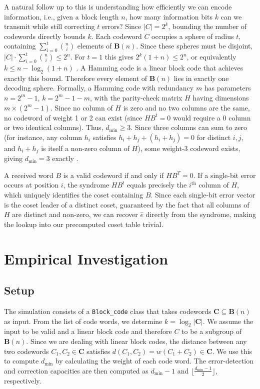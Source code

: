 \documentclass{article}
\begin{document}
A natural follow up to this is understanding how efficiently we can encode information, i.e., given a block length 
\(n\), how many information bits \(k\) can we transmit while still correcting \(t\) errors? Since \(|C| = 2^k\), 
bounding the number of codewords directly bounds \(k\). Each codeword \(C\) occupies a sphere of radius \(t\), 
containing \(\sum_{i=0}^{t}\binom{n}{i}\) elements of \(\mathbf{B}(n)\). Since these spheres must be disjoint,
\(|C| \cdot \sum_{i=0}^{t}\binom{n}{i} \leq 2^n\). For \(t=1\) this gives \(2^k(1+n) \leq 2^n\), or equivalently
\(k \leq n - \log_2(1+n)\) \parencite{berlekamp1972survey}.
A Hamming code is a linear block code that achieves exactly this bound. Therefore every element of 
\(\mathbf{B}(n)\) lies in exactly one decoding sphere. Formally, a Hamming code with redundancy \(m\)
has parameters \(n = 2^m - 1\), \(k = 2^m - 1 - m\), with the parity-check matrix \(H\) having dimensions
\(m \times (2^m-1)\). Since no column of \(H\) is zero and no two columns are the same, no codeword of weight 
1 or 2 can exist (since \(HB^t = 0\) would require a 0 column or two identical columns). Thus, \(d_\text{min}
\geq 3\). Since three columns can sum to zero (for instance, any column $h_i$ satisfies $h_i + h_j + (h_i + h_j)
= 0$ for distinct $i, j$, and $h_i + h_j$ is itself a non-zero column of $H$), some weight-3 codeword exists,
giving \(d_\text{min} = 3\) exactly \parencite{hamming1950error}.

A received word \(B\) is a valid codeword if and only if \(HB^T = 0\). If a single-bit error occurs at position 
\(i\), the syndrome \(HB^t\) equals precisely the \(i^\text{th}\) column of \(H\), which uniquely identifies 
the coset containing \(B\). Since each single-bit error vector is the coset leader of a distinct coset, 
guaranteed by the fact that all columns of \(H\) are distinct and non-zero, we can recover \(\hat{e}\) directly
from the syndrome, making the lookup into our precomputed coset table trivial.

\section{Empirical Investigation}
\subsection{Setup}
The simulation \parencite{jaish2026} consists of a \texttt{Block\_code} class that takes codewords
$\mathbf{C} \subseteq \mathbf{B}(n)$ as input. From the list of code words, we determine 
$k = \log_2 |\mathbf{C}|$. We assume the input to be valid and a linear block code 
and therefore $C$ to be a subgroup of $\mathbf{B}(n)$. Since we are dealing with linear block codes,
the distance between any two codewords $C_1, C_2 \in \mathbf{C}$ satisfies $d(C_1, C_2) = w(C_1 + C_2)
\in \mathbf{C}$. We use this to compute $d_\text{min}$ by calculating the weight of each code word. 
The error-detection and correction capacities are then computed as $d_{\min} - 1$ and $\lfloor 
\frac{d_{\min}-1}{2} \rfloor$, respectively.
\end{document}

